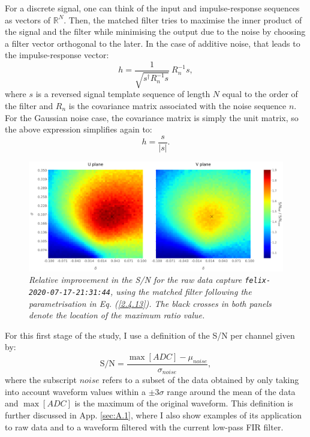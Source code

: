 For a discrete signal, one can think of the input and impulse-response sequences as vectors of $\mathbb{R}^{N}$. Then, the matched filter tries to maximise the inner product of the signal and the filter while minimising the output due to the noise by choosing a filter vector orthogonal to the later. In the case of additive noise, that leads to the impulse-response vector:
\begin{equation}\label{2.4.11}
	h = \frac{1}{\sqrt{s^{\dagger} R_{n}^{-1} s}} \ R_{n}^{-1} s,
\end{equation}
where $s$ is a reversed signal template sequence of length $N$ equal to the order of the filter and $R_{n}$ is the covariance matrix associated with the noise sequence $n$. For the Gaussian noise case, the covariance matrix is simply the unit matrix, so the above expression simplifies again to:
\begin{equation}\label{2.4.12}
	h = \frac{s}{|s|}.
\end{equation}

\begin{figure}[t]
	\centering
	\includegraphics[width=1\linewidth]{Images/Matched_Filter/mf_fir_opt.png}
	\caption{\textit{Relative improvement in the S/N for the raw data capture \texttt{felix-2020-07-17-21:31:44}, using the matched filter following the parametrisation in Eq. (\ref{2.4.13}). The black crosses in both panels denote the location of the maximum ratio value.}}
	\label{fig:mf_opt}
\end{figure}

For this first stage of the study, I use a definition of the S/N per channel given by:
\begin{equation}
	\mathrm{S/N} = \frac{\max{[ADC]} - \mu_{noise}}{\sigma_{noise}},
\end{equation}
where the subscript $noise$ refers to a subset of the data obtained by only taking into account waveform values within a $\pm 3 \sigma$ range around the mean of the data and $\max{[ADC]}$ is the maximum of the original waveform. This definition is further discussed in App. \ref{sec:A.1}, where I also show examples of its application to raw data and to a waveform filtered with the current low-pass FIR filter.

